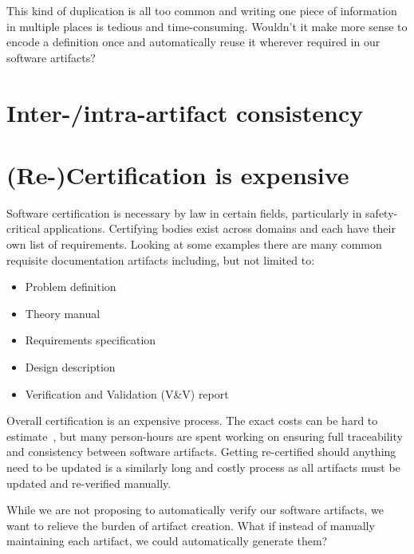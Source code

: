 \documentclass[twocolumn]{article}
\begin{document}
This kind of duplication is all too common and writing one piece of information 
in multiple places is tedious and time-consuming. Wouldn't it make more sense 
to encode a definition once and automatically reuse it wherever required in 
our software artifacts?

\section{Inter-/intra-artifact consistency}



\section{(Re-)Certification is expensive}

Software certification is necessary by law in certain fields, particularly in 
safety-critical applications. Certifying bodies exist across domains 
and each have their own list of requirements. Looking at some 
examples \cite{CDRH2002,CSA1999,CSA2009,FDA2014} there are many common  
requisite documentation artifacts including, but not limited to:

\begin{itemize}
\itemsep-.2em
\item Problem definition
\item Theory manual
\item Requirements specification
\item Design description
\item Verification and Validation (V\&V) report
\end{itemize}

Overall certification is an expensive process. The exact costs can be hard to 
estimate~\cite{HatcliffEtAl2009}, but many person-hours are spent 
working on ensuring full traceability and consistency between software 
artifacts. Getting re-certified should anything need to be updated is a 
similarly long and costly process as all artifacts must be updated and 
re-verified manually.

While we are not proposing to automatically verify our software artifacts, we 
want to relieve the burden of artifact creation. What if instead of manually 
maintaining each artifact, we could automatically generate them?


  
\end{document}
